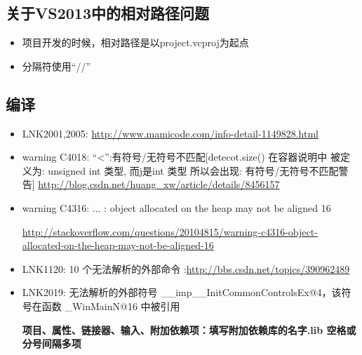 \documentclass[UTF8,a4paper,12pt]{ctexbook} %
\begin{document}
		\subsection{关于VS2013中的相对路径问题}
			\begin{itemize}
				\item  项目开发的时候，相对路径是以project.vcproj为起点
				\item  分隔符使用“//”
			\end{itemize}	
		\subsection{编译}
			\begin{itemize}
				\item  LNK2001,2005: \url{http://www.mamicode.com/info-detail-1149828.html}
				\item  warning C4018: “<”:有符号/无符号不匹配[detecot.size() 在容器说明中 被定义为: unsigned int 类型, 而j是int 类型 所以会出现: 有符号/无符号不匹配警告] \url{http://blog.csdn.net/huang\_xw/article/details/8456157}
				
				\item  warning C4316: ... : object allocated on the heap may not be aligned 16
				
				\url{http://stackoverflow.com/questions/20104815/warning-c4316-object-allocated-on-the-heap-may-not-be-aligned-16}
				
				\item LNK1120: 10 个无法解析的外部命令 :\url{http://bbs.csdn.net/topics/390962489}
				
				\item LNK2019: 无法解析的外部符号 \_\_imp\_\_InitCommonControlsEx@4，该符号在函数 \_WinMainN@16 中被引用 
				
				\textbf{项目、属性、链接器、输入、附加依赖项：填写附加依赖库的名字.lib 空格或分号间隔多项}
			\end{itemize}
\end{document}
